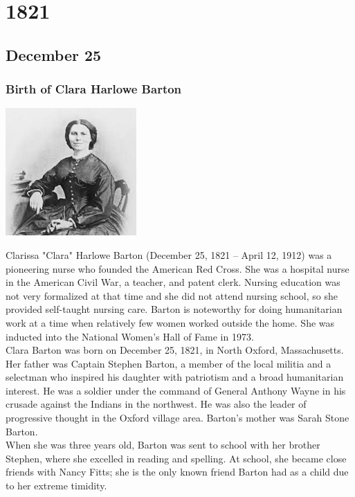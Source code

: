 \documentclass[11pt]{report}
\begin{document}
\chapter{1821}
\section{December 25}
\subsection{Birth of Clara Harlowe Barton}
\vspace{2mm}\begin{center}\includegraphics[width=5cm]{./img/claraBarton.jpg}\end{center}
Clarissa "Clara" Harlowe Barton (December 25, 1821 – April 12, 1912) was a pioneering nurse who founded the American Red Cross. She was a hospital nurse in the American Civil War, a teacher, and patent clerk. Nursing education was not very formalized at that time and she did not attend nursing school, so she provided self-taught nursing care. Barton is noteworthy for doing humanitarian work at a time when relatively few women worked outside the home. She was inducted into the National Women's Hall of Fame in 1973.\\ \indent Clara Barton was born on December 25, 1821, in North Oxford, Massachusetts. Her father was Captain Stephen Barton, a member of the local militia and a selectman who inspired his daughter with patriotism and a broad humanitarian interest. He was a soldier under the command of General Anthony Wayne in his crusade against the Indians in the northwest. He was also the leader of progressive thought in the Oxford village area. Barton's mother was Sarah Stone Barton.\\
\indent When she was three years old, Barton was sent to school with her brother Stephen, where she excelled in reading and spelling. At school, she became close friends with Nancy Fitts; she is the only known friend Barton had as a child due to her extreme timidity.
\end{document}
